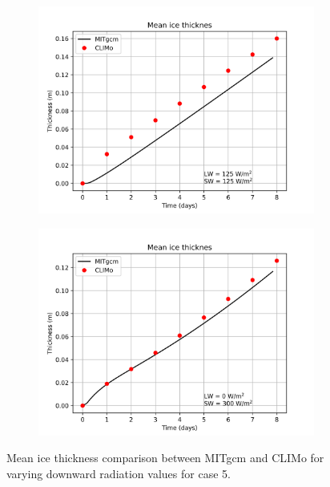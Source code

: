 \documentclass[11pt]{article}
\begin{document}
\begin{figure}[h!]
\begin{subfigure}{0.475\linewidth}
\includegraphics[width=\linewidth]{climo/MITgcm-CLIMo-compare-125-125}
\end{subfigure}
\begin{subfigure}{0.475\linewidth}
\includegraphics[width=\linewidth]{climo/MITgcm-CLIMo-compare-0-300}
\end{subfigure}
\caption{Mean ice thickness comparison between MITgcm and CLIMo for varying downward radiation values for case 5.}
\label{fig:CLIMoCompare}
\end{figure}
\end{document}
